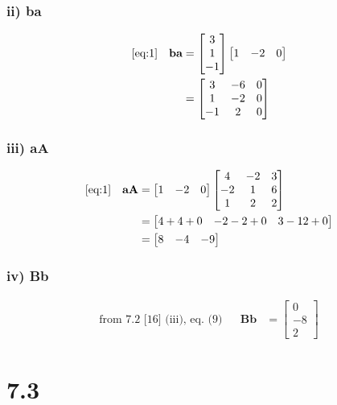 \documentclass{article}
\begin{document}
\subsubsection*{ii) \textbf{ba}}

\begin{align}
    \label{eq:5}
    \eqref{eq:1} &&
    \textbf{ba} &= \begin{bmatrix} 3\\ 1\\ -1 \end{bmatrix} \begin{bmatrix} 1 & -2 & 0 \end{bmatrix}
    \\
    \label{eq:6}
    && &= \begin{bmatrix}
    3 & -6 & 0\\
    1 & -2 & 0\\
    -1 & 2 & 0
    \end{bmatrix}
\end{align}

\subsubsection*{iii) \textbf{aA}}

\begin{align}
    \label{eq:7}
    \eqref{eq:1} &&
    \textbf{aA} &= \begin{bmatrix} 1 & -2 & 0 \end{bmatrix} \begin{bmatrix} 4 & -2 & 3\\ -2 & 1 & 6\\ 1 & 2 & 2 \end{bmatrix}
    \\
    \label{eq:8}
    && &= \begin{bmatrix}
    4+4+0 & -2-2+0 & 3-12+0
    \end{bmatrix}
    \\
    \label{eq:9}
    && &= \begin{bmatrix}
    8 & -4 & -9
    \end{bmatrix}
\end{align}

\subsubsection*{iv) \textbf{Bb}}

\begin{align}
    \label{eq:10}
    \text{from 7.2 [16] (iii), eq. (9)} && 
    \textbf{Bb} &= \begin{bmatrix}
    0\\
    -8\\
    2
    \end{bmatrix}
\end{align}

\newpage

\section*{7.3}
\setcounter{equation}{0}
\end{document}

